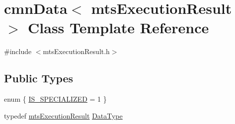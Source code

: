 \hypertarget{classcmn_data_3_01mts_execution_result_01_4}{}\section{cmn\+Data$<$ mts\+Execution\+Result $>$ Class Template Reference}
\label{classcmn_data_3_01mts_execution_result_01_4}


{\ttfamily \#include $<$mts\+Execution\+Result.\+h$>$}

\subsection*{Public Types}
\begin{DoxyCompactItemize}
\item 
enum \{ \hyperlink{classcmn_data_3_01mts_execution_result_01_4_a61233bb730e9193a816e39e51444dd34a0113b7ee2fabebada4b23fb00857680a}{I\+S\+\_\+\+S\+P\+E\+C\+I\+A\+L\+I\+Z\+E\+D} = 1
 \}
\item 
typedef \hyperlink{classmts_execution_result}{mts\+Execution\+Result} \hyperlink{classcmn_data_3_01mts_execution_result_01_4_ac2ad50be3b07e7b046435ae0ed516b18}{Data\+Type}
\end{DoxyCompactItemize}
